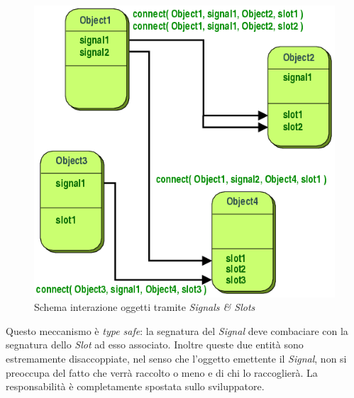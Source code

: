 	\begin{figure}[!h]
		\centering
		\includegraphics[scale=0.5]{./Content/Immagini/SignalSlot}
		\caption{Schema interazione oggetti tramite \textit{Signals \& Slots}}
		\label{signalimg}
	\end{figure}
	Questo meccanismo è \textit{type safe}: la segnatura del \textit{Signal}\glossario{} deve combaciare con la segnatura dello \textit{Slot}\glossario{} ad esso associato. Inoltre queste due entità sono estremamente disaccoppiate, nel senso che l'oggetto emettente il \textit{Signal}\glossario{}, non si preoccupa del fatto che verrà raccolto o meno e di chi lo raccoglierà. La responsabilità è completamente spostata sullo sviluppatore.
	
